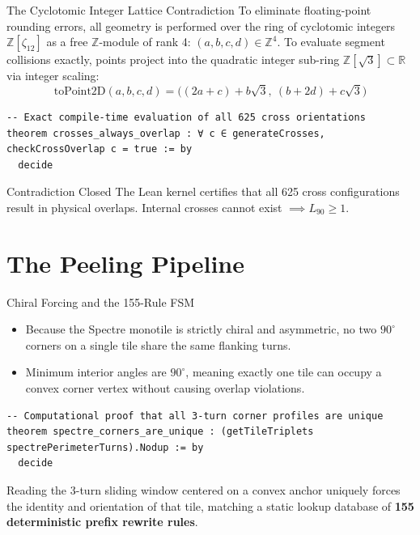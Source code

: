 \documentclass[10pt]{beamer}
\begin{document}
\begin{frame}[fragile]{The Cyclotomic Integer Lattice Contradiction}
To eliminate floating-point rounding errors, all geometry is performed over the ring of cyclotomic integers $\mathbb{Z}[\zeta_{12}]$ as a free $\mathbb{Z}$-module of rank 4: $(a, b, c, d) \in \mathbb{Z}^4$.
\vfill
To evaluate segment collisions exactly, points project into the quadratic integer sub-ring $\mathbb{Z}[\sqrt{3}] \subset \mathbb{R}$ via integer scaling:
$$\text{toPoint2D}(a, b, c, d) = \Big( (2a + c) + b\sqrt{3}, \ (b + 2d) + c\sqrt{3} \Big)$$
\vfill
\begin{lstlisting}[language=Lean4]
-- Exact compile-time evaluation of all 625 cross orientations
theorem crosses_always_overlap : ∀ c ∈ generateCrosses, checkCrossOverlap c = true := by
  decide
\end{lstlisting}
\begin{block}{Contradiction Closed}
The Lean kernel certifies that all 625 cross configurations result in physical overlaps. Internal crosses cannot exist $\implies L_{90} \ge 1$.
\end{block}
\end{frame}

\section{The Peeling Pipeline}

\begin{frame}[fragile]{Chiral Forcing and the 155-Rule FSM}
\begin{itemize}
    \item Because the Spectre monotile is strictly chiral and asymmetric, no two $90^\circ$ corners on a single tile share the same flanking turns.
    \item Minimum interior angles are $90^\circ$, meaning exactly one tile can occupy a convex corner vertex without causing overlap violations.
\end{itemize}
\vfill
\begin{lstlisting}[language=Lean4]
-- Computational proof that all 3-turn corner profiles are unique
theorem spectre_corners_are_unique : (getTileTriplets spectrePerimeterTurns).Nodup := by
  decide
\end{lstlisting}
\vfill
Reading the 3-turn sliding window centered on a convex anchor uniquely forces the identity and orientation of that tile, matching a static lookup database of \textbf{155 deterministic prefix rewrite rules}.
\end{frame}
\end{document}

